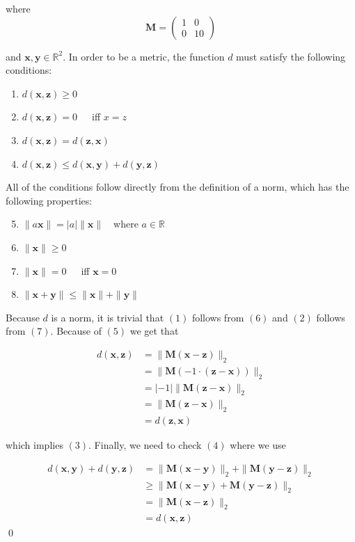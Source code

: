\documentclass[11pt,a4paper]{article}
\begin{document}
where
$$\bm{M} = \begin{pmatrix} 1 & 0 \\ 0 & 10 \end{pmatrix}$$

and $\bm{x},\bm{y} \in \mathbb{R}^2$. In order to be a metric, the function $d$ must satisfy the following conditions:

\begin{enumerate}
    \item $d(\bm{x},\bm{z}) \geq 0$
    \item $d(\bm{x},\bm{z}) = 0$\ \ \ iff $x = z$
    \item $d(\bm{x},\bm{z}) = d(\bm{z},\bm{x})$
    \item $d(\bm{x},\bm{z}) \leq d(\bm{x},\bm{y}) + d(\bm{y},\bm{z})$
\end{enumerate}

All of the conditions follow directly from the definition of a norm, which has the
following properties:

\begin{enumerate}
    \setcounter{enumi}{4}
    \item $\| a\bm{x}\| = |a|\| \bm{x} \|$\ \ where $a \in \mathbb{R}$
    \item $\| \bm{x} \| \geq 0$
    \item $\| \bm{x} \| = 0$\ \ \ iff $\bm{x} = 0$
    \item $\| \bm{x} + \bm{y} \| \leq \| \bm{x} \| + \| \bm{y} \|$
\end{enumerate}

Because $d$ is a norm, it is trivial that $(1)$ follows from $(6)$ and $(2)$ follows from $(7)$. Because of $(5)$ we get that 

\begin{align*}
    d(\bm{x}, \bm{z}) &= \| \bm{M}(\bm{x} - \bm{z}) \|_{2} \\
                      &= \| \bm{M}(-1\cdot(\bm{z} - \bm{x})) \|_{2} \\
                      &= |-1|\| \bm{M}(\bm{z} - \bm{x}) \|_{2} \tag{per 5}\\
                      &= \| \bm{M}(\bm{z} - \bm{x}) \|_{2} \\
                      &= d(\bm{z},\bm{x})
\end{align*}

which implies $(3)$. Finally, we need to check $(4)$ where we use

\begin{align*}
d(\bm{x}, \bm{y}) + 
d(\bm{y}, \bm{z}) &= \| \bm{M}(\bm{x} - \bm{y}) \|_{2} + \| \bm{M}(\bm{y} - \bm{z}) \|_{2} \\
                  &\geq \| \bm{M}(\bm{x} - \bm{y}) +  \bm{M}(\bm{y} - \bm{z}) \|_{2} \tag{per 8}\\
                  &= \| \bm{M}(\bm{x} - \bm{z}) \|_{2} \\
                  &= d(\bm{x},\bm{z})
\end{align*}
\qed
\end{document}
